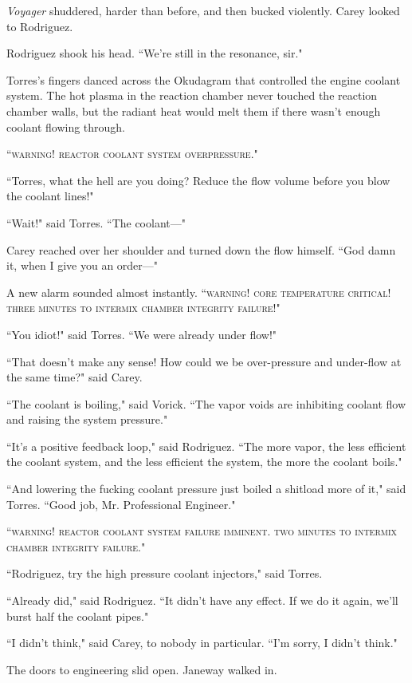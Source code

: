 \documentclass[twoside,letterpaper,12pt]{memoir}
\begin{document}
\textit{Voyager} shuddered, harder than before, and then bucked violently. Carey looked to Rodriguez.

Rodriguez shook his head. ``We're still in the resonance, sir."

Torres's fingers danced across the Okudagram that controlled the engine coolant system. The hot plasma in the reaction chamber never touched the reaction chamber walls, but the radiant heat would melt them if there wasn't enough coolant flowing through.

``\textsc{warning! reactor coolant system overpressure}."

``Torres, what the hell are you doing? Reduce the flow volume before you blow the coolant lines!"

``Wait!" said Torres. ``The coolant---"

Carey reached over her shoulder and turned down the flow himself. ``God damn it, when I give you an order---"

A new alarm sounded almost instantly. ``\textsc{warning! core temperature critical! three minutes to intermix chamber integrity failure!}"

``You idiot!" said Torres. ``We were already under flow!"

``That doesn't make any sense! How could we be over-pressure and under-flow at the same time?" said Carey.

``The coolant is boiling," said Vorick. ``The vapor voids are inhibiting coolant flow and raising the system pressure."

``It's a positive feedback loop," said Rodriguez. ``The more vapor, the less efficient the coolant system, and the less efficient the system, the more the coolant boils."

``And lowering the fucking coolant pressure just boiled a shitload more of it," said Torres. ``Good job, Mr. Professional Engineer."

``\textsc{warning! reactor coolant system failure imminent. two minutes to intermix chamber integrity failure}."

``Rodriguez, try the high pressure coolant injectors," said Torres.

``Already did," said Rodriguez. ``It didn't have any effect. If we do it again, we'll burst half the coolant pipes."

``I didn't think," said Carey, to nobody in particular. ``I'm sorry, I didn't think."

The doors to engineering slid open. Janeway walked in.
\end{document}
